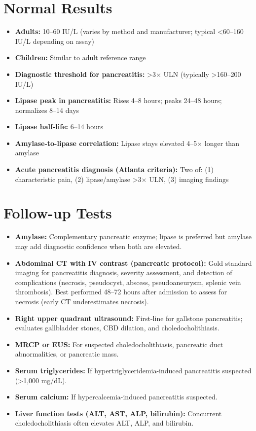 \section*{Normal Results}
\begin{itemize}
  \item \textbf{Adults:} 10--60 IU/L (varies by method and manufacturer; typical <60--160 IU/L depending on assay)
  \item \textbf{Children:} Similar to adult reference range
  \item \textbf{Diagnostic threshold for pancreatitis:} >3$\times$ ULN (typically >160--200 IU/L)
  \item \textbf{Lipase peak in pancreatitis:} Rises 4--8 hours; peaks 24--48 hours; normalizes 8--14 days
  \item \textbf{Lipase half-life:} 6--14 hours
  \item \textbf{Amylase-to-lipase correlation:} Lipase stays elevated 4--5$\times$ longer than amylase
  \item \textbf{Acute pancreatitis diagnosis (Atlanta criteria):} Two of: (1) characteristic pain, (2) lipase/amylase >3$\times$ ULN, (3) imaging findings
\end{itemize}

\section*{Follow-up Tests}
\begin{itemize}
  \item \textbf{Amylase:} Complementary pancreatic enzyme; lipase is preferred but amylase may add diagnostic confidence when both are elevated.
  \item \textbf{Abdominal CT with IV contrast (pancreatic protocol):} Gold standard imaging for pancreatitis diagnosis, severity assessment, and detection of complications (necrosis, pseudocyst, abscess, pseudoaneurysm, splenic vein thrombosis). Best performed 48--72 hours after admission to assess for necrosis (early CT underestimates necrosis).
  \item \textbf{Right upper quadrant ultrasound:} First-line for gallstone pancreatitis; evaluates gallbladder stones, CBD dilation, and choledocholithiasis.
  \item \textbf{MRCP or EUS:} For suspected choledocholithiasis, pancreatic duct abnormalities, or pancreatic mass.
  \item \textbf{Serum triglycerides:} If hypertriglyceridemia-induced pancreatitis suspected (>1,000 mg/dL).
  \item \textbf{Serum calcium:} If hypercalcemia-induced pancreatitis suspected.
  \item \textbf{Liver function tests (ALT, AST, ALP, bilirubin):} Concurrent choledocholithiasis often elevates ALT, ALP, and bilirubin.
\end{itemize}

